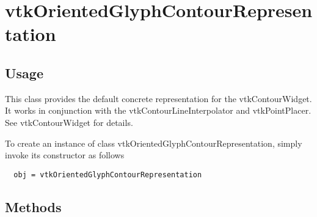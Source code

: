 \section{vtkOrientedGlyphContourRepresentation}

\subsection{Usage}

 This class provides the default concrete representation for the 
 vtkContourWidget. It works in conjunction with the 
 vtkContourLineInterpolator and vtkPointPlacer. See vtkContourWidget
 for details.

To create an instance of class vtkOrientedGlyphContourRepresentation, simply
invoke its constructor as follows
\begin{verbatim}
  obj = vtkOrientedGlyphContourRepresentation
\end{verbatim}
\subsection{Methods}

